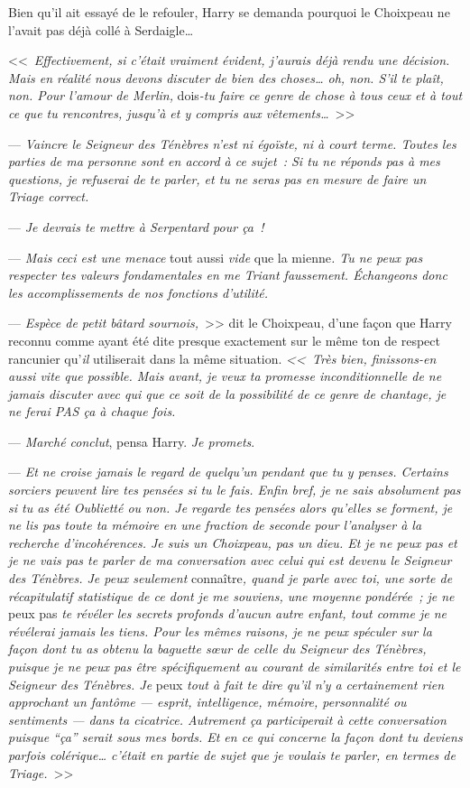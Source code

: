 Bien qu'il ait essayé de le refouler, Harry se demanda pourquoi le Choixpeau ne l'avait pas déjà collé à Serdaigle…

<<~\emph{Effectivement, si c'était vraiment évident, j'aurais déjà rendu une décision. Mais en réalité nous devons discuter de bien des choses… oh, non. S'il te plaît, non. Pour l'amour de Merlin,} dois\emph{-tu faire ce genre de chose à tous ceux et à tout ce que tu rencontres, jusqu'à et y compris aux vêtements…}~>>

--- \emph{Vaincre le Seigneur des Ténèbres n'est ni égoïste, ni à court terme. Toutes les parties de ma personne sont en accord à ce sujet~: Si tu ne réponds pas à mes questions, je refuserai de te parler, et tu ne seras pas en mesure de faire un Triage correct.}

--- \emph{Je devrais te mettre à Serpentard pour ça~!}

--- \emph{Mais ceci est une menace} tout aussi \emph{vide} que la mienne\emph{. Tu ne peux pas respecter tes valeurs fondamentales en me Triant faussement. Échangeons donc les accomplissements de nos fonctions d'utilité.}

--- \emph{Espèce de petit bâtard sournois,}~>> dit le Choixpeau, d'une façon que Harry reconnu comme ayant été dite presque exactement sur le même ton de respect rancunier qu'\emph{il} utiliserait dans la même situation. \emph{<<~Très bien, finissons-en aussi vite que possible. Mais avant, je veux ta promesse inconditionnelle de ne jamais discuter avec qui que ce soit de la possibilité de ce genre de chantage, je ne ferai PAS ça à chaque fois.}

--- \emph{Marché conclut}, pensa Harry. \emph{Je promets}.

--- \emph{Et ne croise jamais le regard de quelqu'un pendant que tu y penses. Certains sorciers peuvent lire tes pensées si tu le fais. Enfin bref, je ne sais absolument pas si tu as été Oublietté ou non. Je regarde tes pensées alors qu'elles se forment, je ne lis pas toute ta mémoire en une fraction de seconde pour l'analyser à la recherche d'incohérences. Je suis un Choixpeau, pas un dieu. Et je ne peux pas et je ne vais pas te parler de ma conversation avec celui qui est devenu le Seigneur des Ténèbres. Je peux seulement} connaître\emph{, quand je parle avec toi, une sorte de récapitulatif statistique de ce dont je me souviens, une moyenne pondérée~; je ne} peux pas \emph{te révéler les secrets profonds d'aucun autre enfant, tout comme je ne révélerai jamais les tiens. Pour les mêmes raisons, je ne peux spéculer sur la façon dont tu as obtenu la baguette sœur de celle du Seigneur des Ténèbres, puisque je ne peux pas être spécifiquement au courant de similarités entre toi et le Seigneur des Ténèbres. Je} peux \emph{tout à fait te dire qu'il n'y a certainement rien approchant un fantôme — esprit, intelligence, mémoire, personnalité ou sentiments — dans ta cicatrice. Autrement ça participerait à cette conversation puisque “ça” serait sous mes bords. Et en ce qui concerne la façon dont tu deviens parfois colérique… c'était en partie de sujet que je voulais te parler, en termes de Triage.}~>>


